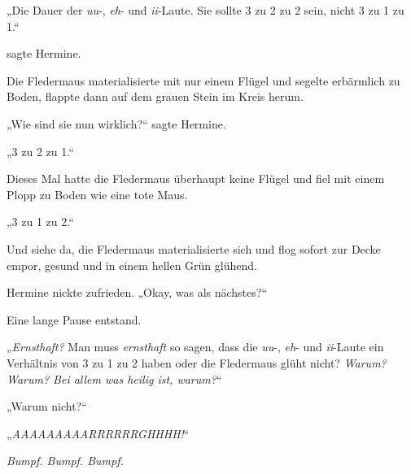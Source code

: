 „Die Dauer der \emph{uu}-, \emph{eh}- und \emph{ii}-Laute. Sie sollte 3 zu 2 zu 2 sein, nicht 3 zu 1 zu 1.“

 sagte Hermine.

Die Fledermaus materialisierte mit nur einem Flügel und segelte erbärmlich zu Boden, flappte dann auf dem grauen Stein im Kreis herum.

„Wie sind sie nun wirklich?“ sagte Hermine.

„3 zu 2 zu 1.“


Dieses Mal hatte die Fledermaus überhaupt keine Flügel und fiel mit einem Plopp zu Boden wie eine tote Maus.

„3 zu 1 zu 2.“

Und siehe da, die Fledermaus materialisierte sich und flog sofort zur Decke empor, gesund und in einem hellen Grün glühend.

Hermine nickte zufrieden. „Okay, was als nächstes?“

Eine lange Pause entstand.

„\emph{Ernsthaft?} Man muss \emph{ernsthaft} so  sagen, dass die \emph{uu}-, \emph{eh}- und \emph{ii}-Laute ein Verhältnis von 3 zu 1 zu 2 haben oder die Fledermaus glüht nicht? \emph{Warum? Warum? Bei allem was heilig ist, warum?}“

„Warum nicht?“

„\emph{AAAAAAAAARRRRRRGHHHH!}“

\emph{Bumpf. Bumpf. Bumpf.}

